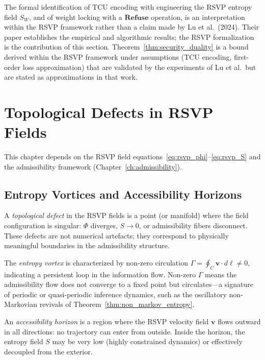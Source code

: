 \documentclass[11pt, openright, twoside]{book}
\theoremstyle{plain}
\theoremstyle{definition}
\theoremstyle{remark}
\newcommand{\vfield}{\mathbf{v}}
\newcommand{\Sfield}{S}
\newcommand{\Refuse}{\mathbf{Refuse}}
\begin{document}
\begin{epistbox}
The formal identification of TCU encoding with engineering the RSVP entropy field
$\Sfield_W$, and of weight locking with a $\Refuse$ operation, is an interpretation
within the RSVP framework rather than a claim made by Lu et al.\ (2024). Their paper
establishes the empirical and algorithmic results; the RSVP formalization is the
contribution of this section. Theorem~\ref{thm:security_duality} is a bound derived
within the RSVP framework under assumptions (TCU encoding, first-order loss approximation)
that are validated by the experiments of Lu et al.\ but are stated as approximations
in that work.
\end{epistbox}

\chapter{Topological Defects in RSVP Fields}

\begin{depbox}
This chapter depends on the RSVP field equations~\eqref{eq:rsvp_phi}--\eqref{eq:rsvp_S}
and the admissibility framework (Chapter~\ref{ch:admissibility}).
\end{depbox}

\section{Entropy Vortices and Accessibility Horizons}

A \emph{topological defect} in the RSVP fields is a point (or manifold) where the field
configuration is singular: $\Phi$ diverges, $\Sfield\to 0$, or admissibility fibers
disconnect. These defects are not numerical artefacts; they correspond to physically
meaningful boundaries in the admissibility structure.

The \emph{entropy vortex} is characterized by non-zero circulation
$\Gamma=\oint_C\vfield\cdot d\ell\neq 0$, indicating a persistent loop in the information
flow. Non-zero $\Gamma$ means the admissibility flow does not converge to a fixed point
but circulates---a signature of periodic or quasi-periodic inference dynamics, such as the
oscillatory non-Markovian revivals of Theorem~\ref{thm:non_markov_entropy}.

An \emph{accessibility horizon} is a region where the RSVP velocity field $\vfield$
flows outward in all directions: no trajectory can enter from outside. Inside the horizon,
the entropy field $\Sfield$ may be very low (highly constrained dynamics) or effectively
decoupled from the exterior.
\end{document}

